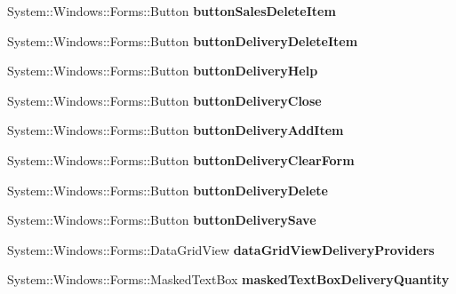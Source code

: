 \begin{DoxyCompactItemize}
System\+::\+Windows\+::\+Forms\+::\+Button {\bfseries button\+Sales\+Delete\+Item}
\item 
\hypertarget{class_magazyn_1_1_magazin_aad0a364d97a7ed11b9853a74c1ea9958}{}\label{class_magazyn_1_1_magazin_aad0a364d97a7ed11b9853a74c1ea9958} 
System\+::\+Windows\+::\+Forms\+::\+Button {\bfseries button\+Delivery\+Delete\+Item}
\item 
\hypertarget{class_magazyn_1_1_magazin_a48b294d6f233a803134c091631f3bd87}{}\label{class_magazyn_1_1_magazin_a48b294d6f233a803134c091631f3bd87} 
System\+::\+Windows\+::\+Forms\+::\+Button {\bfseries button\+Delivery\+Help}
\item 
\hypertarget{class_magazyn_1_1_magazin_a789f6a5dcc3bd528f2bd1c42455137a6}{}\label{class_magazyn_1_1_magazin_a789f6a5dcc3bd528f2bd1c42455137a6} 
System\+::\+Windows\+::\+Forms\+::\+Button {\bfseries button\+Delivery\+Close}
\item 
\hypertarget{class_magazyn_1_1_magazin_aa638a65a299e0978ed27c6b769b28601}{}\label{class_magazyn_1_1_magazin_aa638a65a299e0978ed27c6b769b28601} 
System\+::\+Windows\+::\+Forms\+::\+Button {\bfseries button\+Delivery\+Add\+Item}
\item 
\hypertarget{class_magazyn_1_1_magazin_ac01bc8c495b165842b4d66dd816daadd}{}\label{class_magazyn_1_1_magazin_ac01bc8c495b165842b4d66dd816daadd} 
System\+::\+Windows\+::\+Forms\+::\+Button {\bfseries button\+Delivery\+Clear\+Form}
\item 
\hypertarget{class_magazyn_1_1_magazin_aa7be013e3986a89a5c6e9f8d11c777a6}{}\label{class_magazyn_1_1_magazin_aa7be013e3986a89a5c6e9f8d11c777a6} 
System\+::\+Windows\+::\+Forms\+::\+Button {\bfseries button\+Delivery\+Delete}
\item 
\hypertarget{class_magazyn_1_1_magazin_ac4aa114a9a5b7e2fab6571d2c787a518}{}\label{class_magazyn_1_1_magazin_ac4aa114a9a5b7e2fab6571d2c787a518} 
System\+::\+Windows\+::\+Forms\+::\+Button {\bfseries button\+Delivery\+Save}
\item 
\hypertarget{class_magazyn_1_1_magazin_a192a7e39c555583c0cee76b6d01d0fbf}{}\label{class_magazyn_1_1_magazin_a192a7e39c555583c0cee76b6d01d0fbf} 
System\+::\+Windows\+::\+Forms\+::\+Data\+Grid\+View {\bfseries data\+Grid\+View\+Delivery\+Providers}
\item 
\hypertarget{class_magazyn_1_1_magazin_a045f48623257d6bc395140e73bee3c62}{}\label{class_magazyn_1_1_magazin_a045f48623257d6bc395140e73bee3c62} 
System\+::\+Windows\+::\+Forms\+::\+Masked\+Text\+Box {\bfseries masked\+Text\+Box\+Delivery\+Quantity}
\item 

\end{DoxyCompactItemize}
